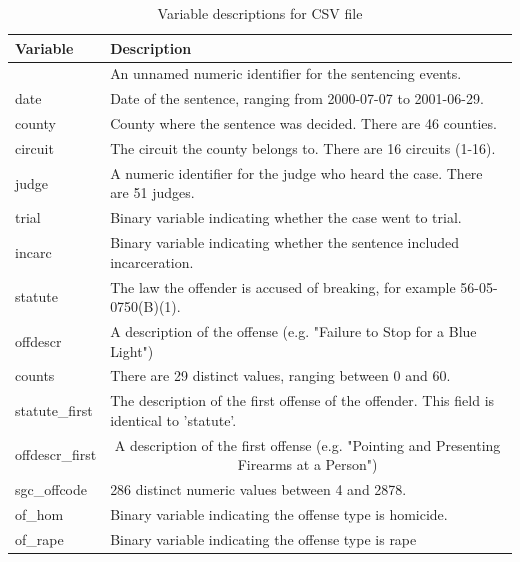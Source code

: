 \documentclass[11pt, oneside]{article}   	%
\theoremstyle{ModifiedStyle}
\begin{document}
      \begin{table}[H]
        \centering
        \caption{Variable descriptions for CSV file}
        \label{tab:csv-vars}
        \begin{tabular}{|ll|}
        \hline
        \textbf{Variable} & \textbf{Description}                                                        \\ \hline
                          & An unnamed numeric identifier for the sentencing events.                    \\
        date              & Date of the sentence, ranging from 2000-07-07 to 2001-06-29.                \\
        county            & County where the sentence was decided. There are 46 counties.               \\
        circuit           & The circuit the county belongs to. There are 16 circuits (1-16).            \\
        judge             & A numeric identifier for the judge who heard the case. There are 51 judges. \\
        trial             & Binary variable indicating whether the case went to trial.                  \\
        incarc            & Binary variable indicating whether the sentence included incarceration.     \\
        statute           & The law the offender is accused of breaking, for example 56-05-0750(B)(1).  \\
        offdescr          & A description of the offense (e.g. "Failure to Stop for a Blue Light")      \\
        counts            & There are 29 distinct values, ranging between 0 and 60.                     \\
        statute\_first  & The description of the first offense of the offender. This field is identical to 'statute'.                   \\
        offdescr\_first & \multicolumn{1}{c|}{A description of the first offense (e.g. "Pointing and Presenting Firearms at a Person")} \\
        sgc\_offcode      & 286 distinct numeric values between 4 and 2878.                             \\
        of\_hom           & Binary variable indicating the offense type is homicide.                    \\
        of\_rape          & Binary variable indicating the offense type is rape                         \\

\end{tabular}
\end{table}
\end{document}
